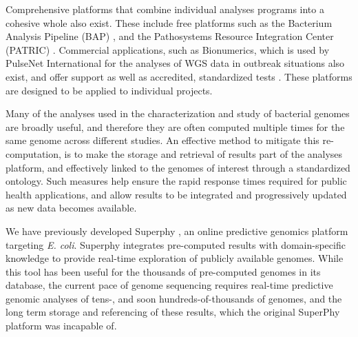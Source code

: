 \documentclass{article}
\begin{document}
Comprehensive platforms that combine individual analyses programs into a cohesive whole also exist. These include free platforms such as the Bacterium Analysis Pipeline (BAP) \cite{thomsen2016bacterial}, and the Pathosystems Resource Integration Center (PATRIC) \cite{wattam2016improvements}. Commercial applications, such as Bionumerics, which is used by PulseNet International for the analyses of WGS data in outbreak situations also exist, and offer support as well as accredited, standardized tests \cite{swaminathan2001pulsenet}. These platforms are designed to be applied to individual projects.

Many of the analyses used in the characterization and study of bacterial genomes are broadly useful, and therefore they are often computed multiple times for the same genome across different studies. An effective method to mitigate this re-computation, is to make the storage and retrieval of results part of the analyses platform, and effectively linked to the genomes of interest through a standardized ontology. Such measures help ensure the rapid response times required for public health applications, and allow results to be integrated and progressively updated as new data becomes available.

We have previously developed Superphy \cite{whiteside2016superphy}, an online predictive genomics platform targeting \textit{E. coli}. Superphy integrates pre-computed results with domain-specific knowledge to provide real-time exploration of publicly available genomes. While this tool has been useful for the thousands of pre-computed genomes in its database, the current pace of genome sequencing requires real-time predictive genomic analyses of tens-, and soon hundreds-of-thousands of genomes, and the long term storage and referencing of these results, which the original SuperPhy platform was incapable of.

\end{document}
